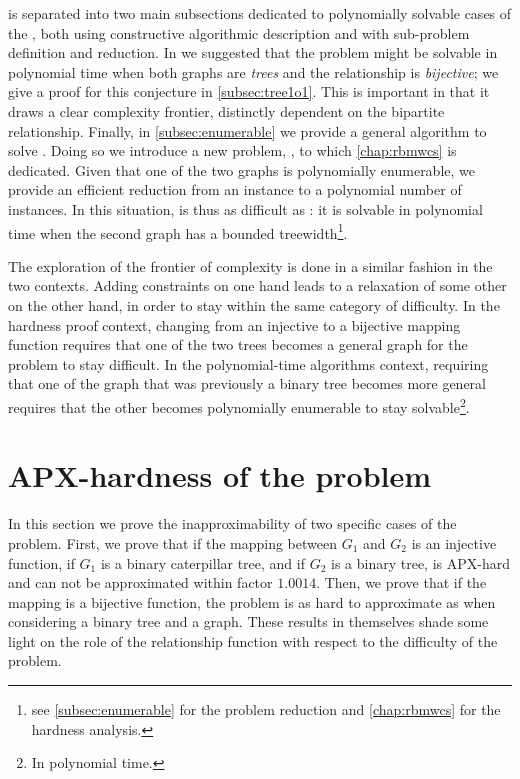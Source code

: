 	 is separated into two main subsections dedicated to polynomially solvable cases of the \mwccs{}, both using constructive algorithmic description and with sub-problem definition and reduction.
	In \cite{hume2015approximation} we suggested that the problem might be solvable in polynomial time when both graphs are \emph{trees} and the relationship is \emph{bijective}; we give a proof for this conjecture in \cref{subsec:tree1o1}.
	This is important in that it draws a clear complexity frontier, distinctly dependent on the bipartite relationship.
	Finally, in \cref{subsec:enumerable} we provide a general algorithm to solve \mwccs{}.
	Doing so we introduce a new problem, \rbmwcs{}, to which \cref{chap:rbmwcs} is dedicated.
	Given that one of the two graphs is polynomially enumerable, we provide an efficient reduction from an \mwccs{} instance to a polynomial number of \rbmwcs{} instances.
	In this situation, \mwccs{} is thus as difficult as \rbmwcs{}: it is solvable in polynomial time when the second graph has a bounded treewidth\footnote{see \cref{subsec:enumerable} for the problem reduction and \cref{chap:rbmwcs} for the \rbmwcs{} hardness analysis.}.

	The exploration of the frontier of complexity is done in a similar fashion in the two contexts.
	Adding constraints on one hand leads to a relaxation of some other on the other hand, in order to stay within the same category of difficulty.
	In the hardness proof context, changing from an injective to a bijective mapping function requires that one of the two trees becomes a general graph for the problem to stay difficult.
	In the polynomial-time algorithms context, requiring that one of the graph that was previously a binary tree becomes more general%
	requires that the other becomes polynomially enumerable to stay solvable\footnote{In polynomial time.}.
	
	\section{APX-hardness of the \mwccs{} problem}
	\label{sec:apx}

		In this section we prove the inapproximability of two specific cases of the \mwccs{} problem.
		First, we prove that if the mapping between $G_1$ and $G_2$ is an injective function, if $G_1$ is a binary caterpillar tree, and if $G_2$ is a binary tree, \mwccs{} is APX-hard and can not be approximated within factor $1.0014$.
		Then, we prove that if the mapping is a bijective function, the problem is as hard to approximate as when considering a binary tree and a graph.
		These results in themselves shade some light on the role of the relationship function with respect to the difficulty of the problem.

